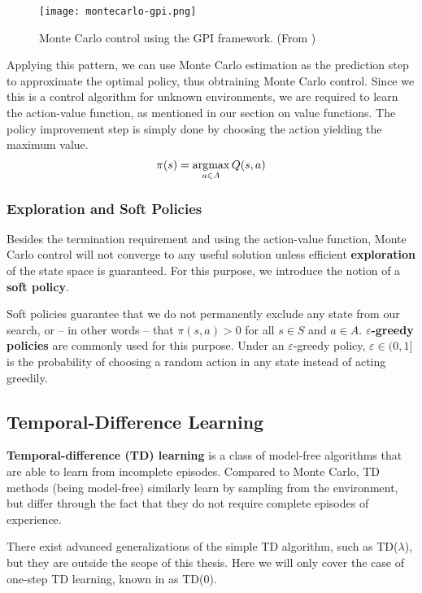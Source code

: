 \begin{figure}[h]
    \texttt{[image: montecarlo-gpi.png]}
    \centering
    \caption{Monte Carlo control using the GPI framework. (From \cite{rlai})}
\end{figure}

Applying this pattern, we can use Monte Carlo estimation as the prediction step to approximate the optimal policy, thus obtraining Monte Carlo control.
Since we this is a control algorithm for unknown environments, we are required to learn the action-value function, as mentioned in our section on value functions.
The policy improvement step is simply done by choosing the action yielding the maximum value.
\begin{equation}
    \pi(s) = \operatorname*{\arg\!\max}_{a \in A}{Q(s, a)}
\end{equation}

\subsubsection{Exploration and Soft Policies}

Besides the termination requirement and using the action-value function, Monte Carlo control will not converge to any useful solution unless efficient \textbf{exploration} of the state space is guaranteed.
For this purpose, we introduce the notion of a \textbf{soft policy}.

Soft policies guarantee that we do not permanently exclude any state from our search, or -- in other words -- that $\pi (s, a) > 0$ for all $s \in S$ and $a \in A$.
\textbf{$\varepsilon$-greedy policies} are commonly used for this purpose.
Under an $\varepsilon$-greedy policy, $\varepsilon \in (0, 1]$ is the probability of choosing a random action in any state instead of acting greedily.

\subsection{Temporal-Difference Learning} \label{rl:td}
\textbf{Temporal-difference (TD) learning} is a class of model-free algorithms that are able to learn from incomplete episodes.
Compared to Monte Carlo, TD methods (being model-free) similarly learn by sampling from the environment, but differ through the fact that they do not require complete episodes of experience.

There exist advanced generalizations of the simple TD algorithm, such as TD($\lambda$), but they are outside the scope of this thesis.
Here we will only cover the case of one-step TD learning, known in \cite{rlai} as TD(0).

